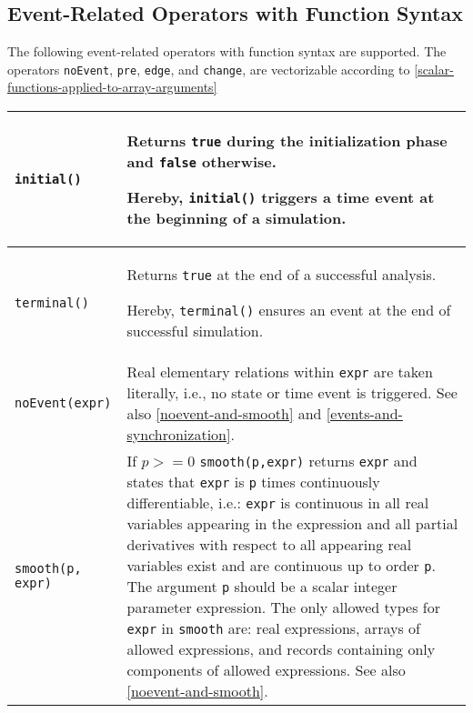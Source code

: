 \subsection{Event-Related Operators with Function Syntax}

The following event-related operators with function syntax are
supported. The operators \lstinline!noEvent!, \lstinline!pre!, \lstinline!edge!, and \lstinline!change!, are
vectorizable according to \autoref{scalar-functions-applied-to-array-arguments}

\begin{longtable}{|p{5cm}|p{8cm}|}
\hline \endhead

\lstinline!initial()! & Returns \lstinline!true! during the initialization phase and \lstinline!false!
otherwise.
\par
\begin{nonnormative*}
Hereby, \lstinline!initial()! triggers a time event at the beginning of a simulation.
\end{nonnormative*}
\\ \hline

\lstinline!terminal()! & Returns \lstinline!true! at the end of a successful analysis.
\par
\begin{nonnormative*}
Hereby, \lstinline!terminal()! ensures an event at the end of successful simulation.
\end{nonnormative*}
\\ \hline

\lstinline!noEvent(expr)! & Real elementary relations within \lstinline!expr! are taken literally, i.e., no state or time event is triggered. See also \autoref{noevent-and-smooth} and \autoref{events-and-synchronization}.\\ \hline

\lstinline!smooth(p, expr)! & If $p>=0$ \lstinline!smooth(p,expr)!
returns \lstinline!expr! and states that \lstinline!expr! is \lstinline!p! times continuously
differentiable, i.e.: \lstinline!expr! is continuous in all real variables appearing
in the expression and all partial derivatives with respect to all
appearing real variables exist and are continuous up to order
\lstinline!p!. The argument \lstinline!p! should be a scalar integer parameter
expression. The only allowed types for \lstinline!expr! in \lstinline!smooth! are: real
expressions, arrays of allowed expressions, and records containing only
components of allowed expressions. See also \autoref{noevent-and-smooth}.\\ \hline


\end{longtable}
